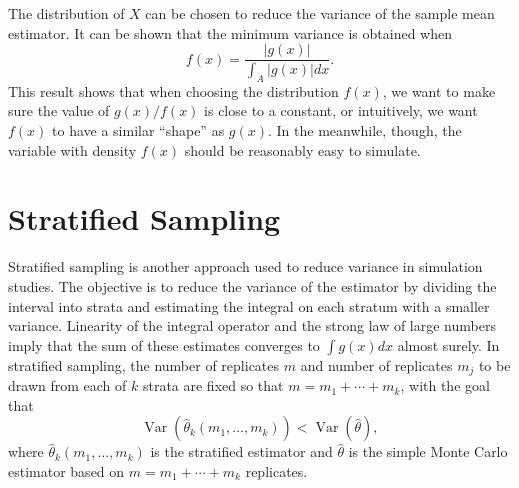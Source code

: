 \documentclass[11pt]{article}
\begin{document}
The distribution of $X$ can be chosen to reduce the variance of the sample mean estimator. It can be shown that the minimum variance is obtained when
\[
f(x)=\frac{|g(x)|}{\int_{A}|g(x)| dx}.
\]
This result shows that when choosing the distribution $f(x)$, we want to make sure the value of $g(x)/f(x)$ is close to a constant, or intuitively, we want $f(x)$ to have a similar ``shape'' as $g(x)$. In the meanwhile, though, the variable with density $f(x)$ should be reasonably easy to simulate.

\section{Stratified Sampling}
Stratified sampling is another approach used to reduce variance in simulation studies. The objective is to reduce the variance of the estimator by dividing the interval into strata and estimating the integral on each stratum with a smaller variance. Linearity of the integral operator and the strong law of large numbers imply that the sum of these estimates converges to $\int g(x) d x$ almost surely. In stratified sampling, the number of replicates $m$ and number of replicates $m_{j}$ to be drawn from each of $k$ strata are fixed so that $m=m_{1}+\cdots+m_{k}$, with the goal that
\[
\operatorname{Var}\left(\widehat{\theta}_{k}\left(m_{1}, \ldots, m_{k}\right)\right)<\operatorname{Var}\left(\widehat{\theta}\right),
\]
where $\widehat{\theta}_{k}\left(m_{1}, \ldots, m_{k}\right)$ is the stratified estimator and $\widehat{\theta}$ is the simple Monte Carlo estimator based on $m=m_{1}+\cdots+m_{k}$ replicates.
\end{document}
